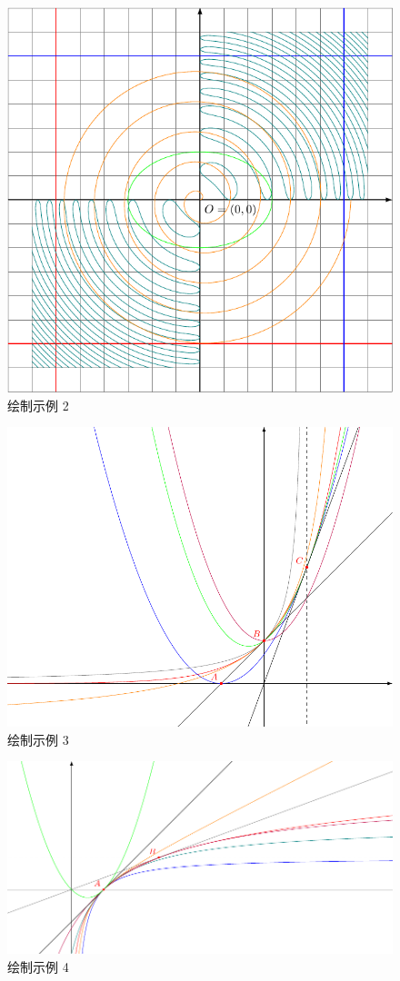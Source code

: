 \begin{figure}[H]
    \centering
    \includegraphics[width=.65\linewidth]{./pics/ztikz_example_2.pdf}
    \caption{绘制示例 2}
    \label{fig:zTikZ-plot—example-2}
\end{figure}


\begin{figure}[H]
    \centering
    \includegraphics[width=.75\linewidth]{./pics/ztikz_example_3.pdf}
    \caption{绘制示例 3}
    \label{fig:zTikZ-plot—example-3}
\end{figure}

\begin{figure}[H]
    \centering
    \includegraphics[width=.75\linewidth]{./pics/ztikz_example_4.pdf}
    \caption{绘制示例 4}
    \label{fig:zTikZ-plot—example-4}
\end{figure}

